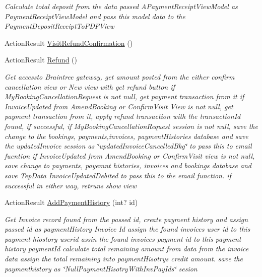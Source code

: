 \begin{DoxyCompactItemize}
\begin{DoxyCompactList}\small\item\em Calculate total deposit from the data passed A\+Payment\+Receipt\+View\+Model as Payment\+Receipt\+View\+Model and pass this model data to the Payment\+Deposit\+Receipt\+To\+P\+D\+F\+View \end{DoxyCompactList}\item 
Action\+Result \hyperlink{class_alfa_accounting_1_1_controllers_1_1_booking_view_models_controller_a32041a3c590714a7ce8b3b59db82ea24}{Visit\+Refund\+Confirmation} ()
\item 
Action\+Result \hyperlink{class_alfa_accounting_1_1_controllers_1_1_booking_view_models_controller_abe04eeac8c2f30835c9661edad9d76a6}{Refund} ()
\begin{DoxyCompactList}\small\item\em Get accessto Braintree gateway, get amount posted from the either confirm cancellation view or New view with get refund button if My\+Booking\+Cancellation\+Request is not null, get payment transaction from it if Invoice\+Updated from Amend\+Booking or Confirm\+Visit View is not null, get payment transaction from it, apply refund transaction with the transaction\+Id found, if successful, if My\+Booking\+Cancellation\+Request session is not null, save the change to the bookings, payments,invoices, payment\+Histories database and save the updated\+Invoice session as \char`\"{}updated\+Invoice\+Cancelled\+Bkg\char`\"{} to pass this to email fucntion if Invoice\+Updated from Amend\+Booking or Confirm\+Visit view is not null, save change to payments, payemnt histories, invoices and bookings database and save Tep\+Data Invoice\+Updated\+Debited to pass this to the email function. if successful in either way, retruns show view \end{DoxyCompactList}\item 
Action\+Result \hyperlink{class_alfa_accounting_1_1_controllers_1_1_booking_view_models_controller_a5d73d599f1b0a2ef694e4fe462df8a21}{Add\+Payment\+History} (int? id)
\begin{DoxyCompactList}\small\item\em Get Invoice record found from the passed id, create payment history and assign passed id as payment\+History Invoice Id assign the found invoice\textquotesingle{}s user id to this payment hiostory userid assin the found invoice\textquotesingle{}s payment id to this payment history payment\+Id calculate total remaining amount from data from the invoice data assign the total remaining into payment\+Hisotry\textquotesingle{}s credit amount. save the paymenthistory as \char`\"{}\+Null\+Payment\+Hisotry\+With\+Inv\+Pay\+Ids\char`\"{} sesion \end{DoxyCompactList}\item 

\end{DoxyCompactItemize}
